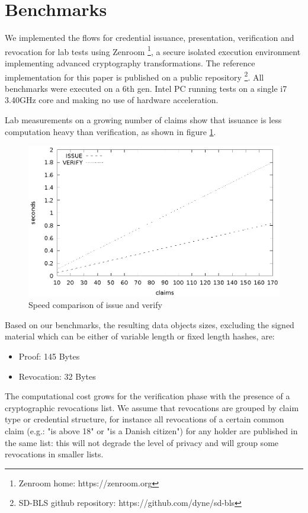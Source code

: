 \section{Benchmarks}

We implemented the flows for credential issuance, presentation,
verification and revocation for lab tests using
Zenroom \footnote{Zenroom home: https://zenroom.org}, a secure
isolated execution environment implementing advanced cryptography
transformations. The reference implementation for this paper is
published on a public repository \footnote{SD-BLS github repository:
https://github.com/dyne/sd-bls}. All benchmarks were executed on a 6th
gen. Intel PC running tests on a single i7 3.40GHz core and making no
use of hardware acceleration.

Lab measurements on a growing number of claims show that issuance is
less computation heavy than verification, as shown in figure
\ref{fig:issueproveverify}.

\begin{figure}
    \centering
    \includegraphics[width=1\linewidth]{issueproveverify.eps}

    \caption{Speed comparison of issue and verify}
    \label{fig:issueproveverify}
\end{figure}

Based on our benchmarks, the resulting data objects sizes, excluding the signed material which can be either of variable length or fixed length hashes, are:
\begin{itemize}
    \item Proof:  145 Bytes
    \item Revocation: 32 Bytes
\end{itemize}

The computational cost grows for the verification phase with the presence of a cryptographic revocations list. We assume that revocations are grouped by claim type or credential structure, for instance all revocations of a certain common claim (e.g.: "is above 18" or "is a Danish citizen") for any holder are published in the same list: this will not degrade the level of privacy and will group some revocations in smaller lists.

